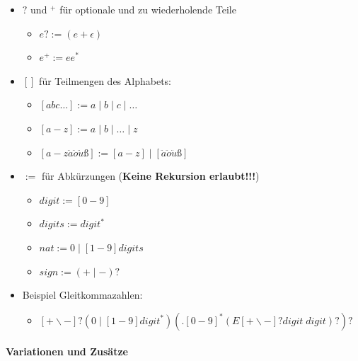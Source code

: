 \documentclass{scrartcl}
\begin{document}
\begin{itemize}
	\item $?$ und $^+$ für optionale und zu wiederholende Teile
	\begin{itemize}
		\item $e? := (e + \epsilon)$
		\item $e^+ := ee^*$
	\end{itemize}
	\item $[]$ für Teilmengen des Alphabets:
	\begin{itemize}
		\item $[abc \ldots] := a \mid b \mid c \mid \ldots$
		\item $[a-z] := a \mid b \mid \ldots \mid z$
		\item $[a-z \ddot{a} \ddot{o} \ddot{u} ß] := [a-z] \mid [\ddot{a} \ddot{o} \ddot{u} ß]$
	\end{itemize}
	\item $:=$ für Abkürzungen (\textbf{Keine Rekursion erlaubt!!!})
	\begin{itemize}
		\item $digit := [0-9]$
		\item $digits := digit^*$
		\item $nat := 0 \mid [1-9]digits$
		\item $sign := (+ \mid -)?$
	\end{itemize}
	\item Beispiel Gleitkommazahlen:
	\begin{itemize}
		\item $[+ \backslash -]? (0 \mid [1-9]digit^*)(. [0-9]^*(E[+ \backslash -]? digit \; digit)?)?$
	\end{itemize}
\end{itemize}

\paragraph{Variationen und Zusätze}
\end{document}
